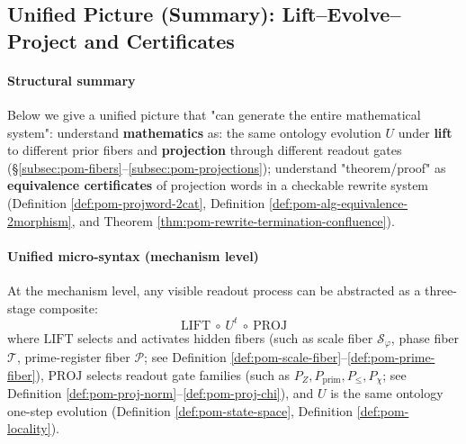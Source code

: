 \subsection{Unified Picture (Summary): Lift–Evolve–Project and Certificates}\label{subsec:pom-unified-picture}
\paragraph{Structural summary}
Below we give a unified picture that "can generate the entire mathematical system": understand \textbf{mathematics} as: the same ontology evolution \(U\) under \textbf{lift} to different prior fibers and \textbf{projection} through different readout gates (\S\ref{subsec:pom-fibers}--\ref{subsec:pom-projections});
understand "theorem/proof" as \textbf{equivalence certificates} of projection words in a checkable rewrite system (Definition \ref{def:pom-projword-2cat}, Definition \ref{def:pom-alg-equivalence-2morphism}, and Theorem \ref{thm:pom-rewrite-termination-confluence}).

\paragraph{Unified micro-syntax (mechanism level)}
At the mechanism level, any visible readout process can be abstracted as a three-stage composite:
\[
\boxed{\;
\mathrm{LIFT}\ \circ\ U^{t}\ \circ\ \mathrm{PROJ}\;}
\]
where \(\mathrm{LIFT}\) selects and activates hidden fibers (such as scale fiber \(\mathcal S_\varphi\), phase fiber \(\mathcal T\), prime-register fiber \(\mathcal P\); see Definition \ref{def:pom-scale-fiber}--\ref{def:pom-prime-fiber}),
\(\mathrm{PROJ}\) selects readout gate families (such as \(P_Z,P_{\mathrm{prim}},P_{\le},P_\chi\); see Definition \ref{def:pom-proj-norm}--\ref{def:pom-proj-chi}),
and \(U\) is the same ontology one-step evolution (Definition \ref{def:pom-state-space}, Definition \ref{def:pom-locality}).


